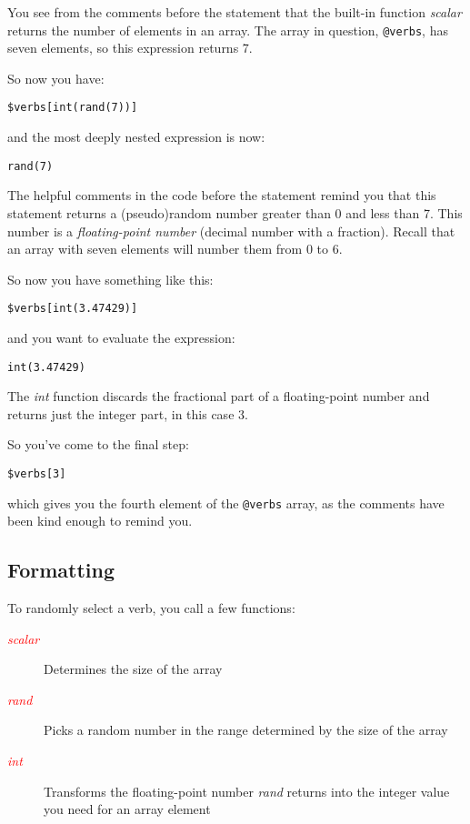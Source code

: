You see from the comments before the statement that the built-in function \textit{scalar} returns the number of elements in an array. The array in question, \verb|@verbs|, has seven elements, so this expression returns 7.

So now you have:

\begin{lstlisting}
$verbs[int(rand(7))]
\end{lstlisting}

and the most deeply nested expression is now:

\begin{lstlisting}
rand(7)
\end{lstlisting}

The helpful comments in the code before the statement remind you that this statement returns a (pseudo)random number greater than 0 and less than 7. This number is a \textit{floating-point number} (decimal number with a fraction). Recall that an array with seven elements will number them from 0 to 6.

So now you have something like this:

\begin{lstlisting}
$verbs[int(3.47429)] 
\end{lstlisting}

and you want to evaluate the expression:

\begin{lstlisting}
int(3.47429) 
\end{lstlisting}

The \textit{int} function discards the fractional part of a floating-point number and returns just the integer part, in this case 3.

So you've come to the final step:

\begin{lstlisting}
$verbs[3]
\end{lstlisting}

which gives you the fourth element of the \verb|@verbs| array, as the comments have been kind enough to remind you. 

\subsection{Formatting}
To randomly select a verb, you call a few functions: 

\begin{description}
  \item[\textcolor{red}{\textit{scalar}}] Determines the size of the array 
  \item[\textcolor{red}{\textit{rand}}] Picks a random number in the range determined by the size of the array 
  \item[\textcolor{red}{\textit{int}}] Transforms the floating-point number \textit{rand} returns into the integer value you need for an array element 
\end{description}

